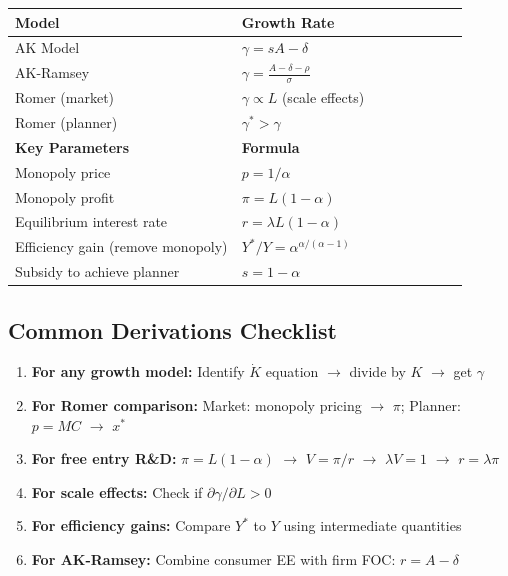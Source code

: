 \begin{center}
\begin{tabular}{p{0.45\linewidth}p{0.45\linewidth}}
\toprule
\textbf{Model} & \textbf{Growth Rate} \\
\midrule
AK Model & $\gamma = sA - \delta$ \\
AK-Ramsey & $\gamma = \frac{A - \delta - \rho}{\sigma}$ \\
Romer (market) & $\gamma \propto L$ (scale effects) \\
Romer (planner) & $\gamma^* > \gamma$ \\
\midrule
\textbf{Key Parameters} & \textbf{Formula} \\
\midrule
Monopoly price & $p = 1/\alpha$ \\
Monopoly profit & $\pi = L(1-\alpha)$ \\
Equilibrium interest rate & $r = \lambda L(1-\alpha)$ \\
Efficiency gain (remove monopoly) & $Y^*/Y = \alpha^{\alpha/(\alpha-1)}$ \\
Subsidy to achieve planner & $s = 1 - \alpha$ \\
\bottomrule
\end{tabular}
\end{center}

\subsection*{Common Derivations Checklist}

\begin{enumerate}
    \item \textbf{For any growth model:} Identify $\dot{K}$ equation $\rightarrow$ divide by $K$ $\rightarrow$ get $\gamma$
    \item \textbf{For Romer comparison:} Market: monopoly pricing $\rightarrow$ $\pi$; Planner: $p = MC$ $\rightarrow$ $x^*$
    \item \textbf{For free entry R\&D:} $\pi = L(1-\alpha)$ $\rightarrow$ $V = \pi/r$ $\rightarrow$ $\lambda V = 1$ $\rightarrow$ $r = \lambda\pi$
    \item \textbf{For scale effects:} Check if $\partial\gamma/\partial L > 0$
    \item \textbf{For efficiency gains:} Compare $Y^*$ to $Y$ using intermediate quantities
    \item \textbf{For AK-Ramsey:} Combine consumer EE with firm FOC: $r = A - \delta$
\end{enumerate}
